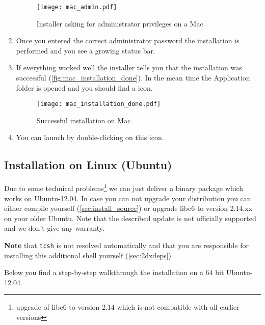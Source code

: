 \begin{enumerate}
	\begin{figure}[H]
		\centering
		\texttt{[image: mac\_admin.pdf]}
		\caption{Installer asking for administrator privileges on a Mac}
		\label{fig:mac_admin}
	\end{figure}
	
	\item Once you entered the correct administrator password the installation is performed and you see a growing status bar.
	\item If everything worked well the installer tells you that the installation was successful (\autoref{fig:mac_installation_done}). In the mean time the Application folder is opened and you should find a {\twodx} icon.
	
	\begin{figure}[H]
		\centering
		\texttt{[image: mac\_installation\_done.pdf]}
		\caption{Successful installation on Mac}
		\label{fig:mac_installation_done}
	\end{figure}
	
	\item You can launch {\twodx} by double-clicking on this icon.
\end{enumerate}

\newpage

\subsection{Installation on Linux (Ubuntu)}
\label{sec:install_deb}
Due to some technical problems\footnote{upgrade of libc6 to version 2.14 which is not compatible with all earlier versions} we can just deliver a binary package which works on Ubuntu-12.04. In case you can not upgrade your distribution you can either compile {\twodx} yourself (\autoref{sec:install_source}) or upgrade libc6 to version 2.14.xx on your older Ubuntu. Note that the described update is not officially supported and we don't give any warranty.

\textbf{Note} that \texttt{tcsh} is not resolved automatically and that you are responsible for installing this additional shell yourself (\autoref{sec:2dxdeps})

Below you find a step-by-step walkthrough the installation on a $64$ bit Ubuntu-12.04. 

